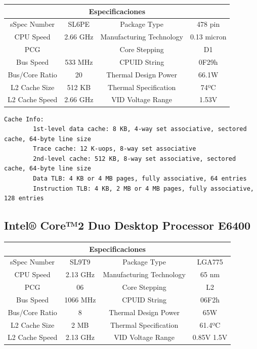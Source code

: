 \documentclass[a4paper,10pt]{article}
\begin{document}
\begin{tabular}{|c|c||c|c|}
\hline
\multicolumn{4}{|c|}{Especificaciones} \\
\hline
sSpec Number & SL6PE & Package Type & 478 pin \\
\hline
CPU Speed & 2.66 GHz & Manufacturing Technology & 0.13 micron \\
\hline
PCG & & Core Stepping & D1 \\
\hline
Bus Speed & 533 MHz & CPUID String & 0F29h \\
\hline
Bus/Core Ratio & 20 & Thermal Design Power & 66.1W \\
\hline
L2 Cache Size & 512 KB & Thermal Specification & 74ºC \\
\hline
L2 Cache Speed & 2.66 GHz & VID Voltage Range & 1.53V \\
\hline
\end{tabular}

\begin{verbatim}
Cache Info:
        1st-level data cache: 8 KB, 4-way set associative, sectored cache, 64-byte line size
        Trace cache: 12 K-uops, 8-way set associative
        2nd-level cache: 512 KB, 8-way set associative, sectored cache, 64-byte line size
        Data TLB: 4 KB or 4 MB pages, fully associative, 64 entries
        Instruction TLB: 4 KB, 2 MB or 4 MB pages, fully associative, 128 entries
\end{verbatim}

\subsection{Intel® Core™2 Duo Desktop Processor E6400}

\begin{tabular}{|c|c||c|c|}
\hline
\multicolumn{4}{|c|}{Especificaciones} \\
\hline
sSpec Number  & SL9T9  & Package Type & LGA775 \\
\hline
CPU Speed  & 2.13 GHz  & Manufacturing Technology & 65 nm \\
\hline
PCG  & 06  & Core Stepping & L2 \\
\hline
Bus Speed  & 1066 MHz  & CPUID String & 06F2h \\
\hline
Bus/Core Ratio  & 8  & Thermal Design Power & 65W \\
\hline
L2 Cache Size  & 2 MB & Thermal Specification & 61.4ºC \\
\hline
L2 Cache Speed  & 2.13 GHz & VID Voltage Range & 0.85V  1.5V \\
\hline
\end{tabular}
\end{document}
